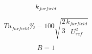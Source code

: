{\newpage\clearpage
{}%
\begin{displaymath}
k_{farfield}
\end{displaymath}%
\lthtmldisplayZ
\lthtmlcheckvsize\clearpage}

{\newpage\clearpage
{}%
\begin{displaymath}
Tu_{farfield}\% = 100 \sqrt{\frac{2}{3} \frac{k_{farfield}}{U_{ref}^2}}
\end{displaymath}%
\lthtmldisplayZ
\lthtmlcheckvsize\clearpage}

{\newpage\clearpage
{}%
\begin{displaymath}
B=1
\end{displaymath}%
\lthtmldisplayZ
\lthtmlcheckvsize\clearpage}



